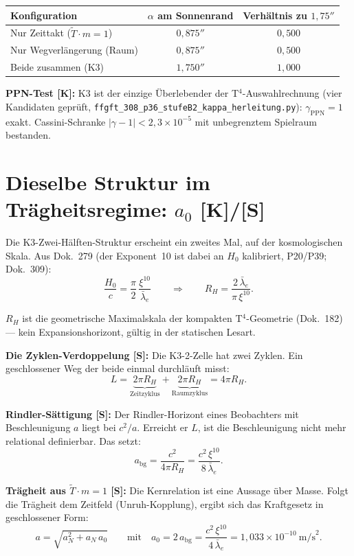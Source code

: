 \begin{center}
\begin{tabular}{lcc}
\toprule
Konfiguration & $\alpha$ am Sonnenrand & Verhältnis zu $1{,}75''$\\
\midrule
Nur Zeittakt ($\tilde T \cdot m = 1$) & $0{,}875''$ & $0{,}500$\\
Nur Wegverlängerung (Raum)            & $0{,}875''$ & $0{,}500$\\
Beide zusammen (K3)                   & $1{,}750''$ & $1{,}000$\\
\bottomrule
\end{tabular}
\end{center}

\textbf{PPN-Test [K]:} K3 ist der einzige Überlebender der
T$^4$-Auswahlrechnung (vier Kandidaten geprüft,
\texttt{ffgft\_308\_p36\_stufeB2\_kappa\_herleitung.py}):
$\gamma_\text{PPN} = 1$ exakt. Cassini-Schranke
$|\gamma - 1| < 2{,}3\times10^{-5}$ mit unbegrenztem Spielraum bestanden.

\section{Dieselbe Struktur im Trägheitsregime: $a_0$ [K]/[S]}

Die K3-Zwei-Hälften-Struktur erscheint ein zweites Mal, auf der
kosmologischen Skala. Aus Dok.~279 (der Exponent~10 ist dabei an $H_0$ kalibriert, P20/P39; Dok.~309):
\[
  \frac{H_0}{c} = \frac{\pi}{2}\,\frac{\xi^{10}}{\bar\lambda_e}
  \qquad\Longrightarrow\qquad
  R_H = \frac{2\,\bar\lambda_e}{\pi\,\xi^{10}}.
\]

$R_H$ ist die geometrische Maximalskala der kompakten T$^4$-Geometrie
(Dok.~182) — kein Expansionshorizont, gültig in der statischen Lesart.

\textbf{Die Zyklen-Verdoppelung [S]:} Die K3-2-Zelle hat zwei Zyklen.
Ein geschlossener Weg der beide einmal durchläuft misst:
\[
  L = \underbrace{2\pi R_H}_{\text{Zeitzyklus}}
    + \underbrace{2\pi R_H}_{\text{Raumzyklus}}
    = 4\pi R_H .
\]

\textbf{Rindler-Sättigung [S]:} Der Rindler-Horizont eines Beobachters
mit Beschleunigung $a$ liegt bei $c^2/a$. Erreicht er $L$, ist die
Beschleunigung nicht mehr relational definierbar. Das setzt:
\[
  a_\text{bg} = \frac{c^2}{4\pi R_H}
              = \frac{c^2\,\xi^{10}}{8\,\bar\lambda_e}.
\]

\textbf{Trägheit aus $\tilde T \cdot m = 1$ [S]:} Die Kernrelation ist
eine Aussage über Masse. Folgt die Trägheit dem Zeitfeld (Unruh-Kopplung),
ergibt sich das Kraftgesetz in geschlossener Form:
\[
  \boxed{a = \sqrt{a_N^2 + a_N\,a_0}}
  \qquad\text{mit}\quad
  a_0 = 2\,a_\text{bg}
      = \frac{c^2\,\xi^{10}}{4\,\bar\lambda_e}
      = 1{,}033\times10^{-10}~\text{m/s}^2.
\]

